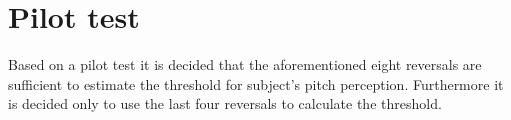 \section*{Pilot test}
%
Based on a pilot test it is decided that the aforementioned eight reversals are sufficient to estimate the threshold for subject's pitch perception. Furthermore it is decided only to use the last four reversals to calculate the threshold.  